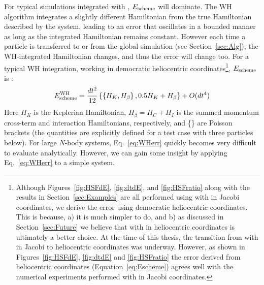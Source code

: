 For typical simulations integrated with \hermes, $E_{\rm scheme}$ will dominate. 
The WH algorithm integrates a slightly different Hamiltonian from the true Hamiltonian described by the system, leading to an error that oscillates in a bounded manner as long as the integrated Hamiltonian remains constant.
However each time a particle is transferred to or from the global simulation (see Section~\ref{sec:Alg}), the WH-integrated Hamiltonian changes, and thus the error will change too.
For a typical WH integration, working in democratic heliocentric coordinates\footnote{Although Figures~\ref{fig:HSFdE}, \ref{fig:dtdE}, and \ref{fig:HSFratio} along with the results in Section~\ref{sec:Examples} are all performed using \hermes with \whfast in Jacobi coordinates, we derive the error using democratic heliocentric coordinates. This is because, a) it is much simpler to do, and b) as discussed in Section~\ref{sec:Future} we believe that \hermes with \whfast in heliocentric coordinates is ultimately a better choice. At the time of this thesis, the transition from \hermes with \whfast in Jacobi to heliocentric coordinates was underway. However, as shown in Figures~\ref{fig:HSFdE}, \ref{fig:dtdE} and \ref{fig:HSFratio} the error derived from heliocentric coordinates (Equation~\ref{eq:Escheme}) agrees well with the numerical experiments performed with \whfast in Jacobi coordinates.}, $E_{\rm scheme}$ is \citep[e.g.][]{Saha1994,Wisdom2006}:
\begin{equation}
E_{\rm scheme}^{\rm WH} = \frac{dt^2}{12} \left \{ \left \{H_K, H_{\beta} \right \},  0.5H_K + H_{\beta} \right \} + O(dt^4)
\label{eq:WHerr}
\end{equation}
Here $H_K$ is the Keplerian Hamiltonian, $H_{\beta} = H_C + H_I$ is the summed momentum cross-term and interaction Hamiltonians, respectively, and \{\} are Poisson brackets (the quantities are explicitly defined for a test case with three particles below). 
For large $N$-body systems, Eq.~\ref{eq:WHerr} quickly becomes very difficult to evaluate analytically. 
However, we can gain some insight by applying Eq.~\ref{eq:WHerr} to a simple system. 


